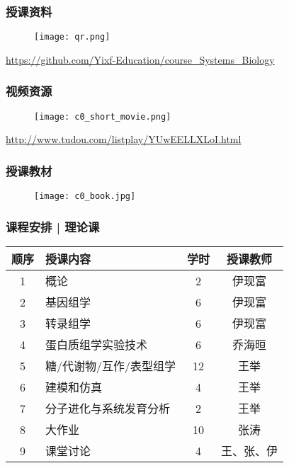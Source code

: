 \begin{frame}
\end{frame}

\begin{frame}
  \frametitle{授课资料}
  \begin{figure}
    \centering
    \texttt{[image: qr.png]}
  \end{figure}
  \begin{center}
  \href{https://github.com/Yixf-Education/course_Systems_Biology}{https://github.com/Yixf-Education/course\_Systems\_Biology}
  \end{center}
\end{frame}

\begin{frame}
  \frametitle{视频资源}
  \begin{figure}
    \centering
    \texttt{[image: c0\_short\_movie.png]}
  \end{figure}
  \begin{center}
    \href{http://www.tudou.com/listplay/YUwEELLXLoI.html}{http://www.tudou.com/listplay/YUwEELLXLoI.html}
  \end{center}
\end{frame}

\begin{frame}
  \frametitle{授课教材}
  \begin{figure}
    \centering
    \texttt{[image: c0\_book.jpg]}
  \end{figure}
\end{frame}

\begin{frame}
  \frametitle{课程安排 | 理论课}
  \begin{table}
    \centering
    \begin{tabular}{clcc}
      \hline
      \rowcolor{blue!50}顺序 & 授课内容 & 学时 & 授课教师\\
      \hline
      1 & 概论 & 2 & 伊现富\\
      2 & 基因组学 & 6 & 伊现富\\
      3 & 转录组学 & 6 & 伊现富\\
      4 & 蛋白质组学实验技术 & 6 & 乔海晅\\
      5 & 糖/代谢物/互作/表型组学 & 12 & 王举\\
      6 & 建模和仿真 & 4 & 王举\\
      7 & 分子进化与系统发育分析 & 2 & 王举\\
      8 & 大作业 & 10 & 张涛\\
      9 & 课堂讨论 & 4 & 王、张、伊\\
      \hline
    \end{tabular}
  \end{table}
\end{frame}

